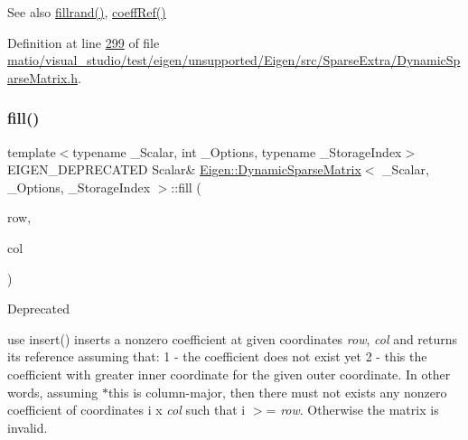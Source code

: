 \begin{DoxySeeAlso}{See also}
\hyperlink{class_eigen_1_1_dynamic_sparse_matrix_a6a5eb3c9d153d8ebdf4e0967321108e2}{fillrand()}, \hyperlink{class_eigen_1_1_dynamic_sparse_matrix_a17093cd39bd0e6ebd6250bc5feb61a0f}{coeff\+Ref()} 
\end{DoxySeeAlso}


Definition at line \hyperlink{matio_2visual__studio_2test_2eigen_2unsupported_2_eigen_2src_2_sparse_extra_2_dynamic_sparse_matrix_8h_source_l00299}{299} of file \hyperlink{matio_2visual__studio_2test_2eigen_2unsupported_2_eigen_2src_2_sparse_extra_2_dynamic_sparse_matrix_8h_source}{matio/visual\+\_\+studio/test/eigen/unsupported/\+Eigen/src/\+Sparse\+Extra/\+Dynamic\+Sparse\+Matrix.\+h}.

\mbox{\label{class_eigen_1_1_dynamic_sparse_matrix_a70c8f529b38fd5b7d93d6dfe1a122723}} 
\subsubsection{\texorpdfstring{fill()}{fill()}\hspace{0.1cm}{\footnotesize\ttfamily [2/2]}}
{\footnotesize\ttfamily template$<$typename \+\_\+\+Scalar, int \+\_\+\+Options, typename \+\_\+\+Storage\+Index$>$ \\
E\+I\+G\+E\+N\+\_\+\+D\+E\+P\+R\+E\+C\+A\+T\+ED Scalar\& \hyperlink{class_eigen_1_1_dynamic_sparse_matrix}{Eigen\+::\+Dynamic\+Sparse\+Matrix}$<$ \+\_\+\+Scalar, \+\_\+\+Options, \+\_\+\+Storage\+Index $>$\+::fill (\begin{DoxyParamCaption}\item[{\hyperlink{group___core___module_a554f30542cc2316add4b1ea0a492ff02}{Index}}]{row,  }\item[{\hyperlink{group___core___module_a554f30542cc2316add4b1ea0a492ff02}{Index}}]{col }\end{DoxyParamCaption})\hspace{0.3cm}{\ttfamily [inline]}}

\begin{DoxyRefDesc}{Deprecated}
\item[\hyperlink{deprecated__deprecated000042}{Deprecated}]use insert() inserts a nonzero coefficient at given coordinates {\itshape row}, {\itshape col} and returns its reference assuming that\+: 1 -\/ the coefficient does not exist yet 2 -\/ this the coefficient with greater inner coordinate for the given outer coordinate. In other words, assuming {\ttfamily $\ast$this} is column-\/major, then there must not exists any nonzero coefficient of coordinates {\ttfamily i} {\ttfamily x} {\itshape col} such that {\ttfamily i} $>$= {\itshape row}. Otherwise the matrix is invalid.\end{DoxyRefDesc}


